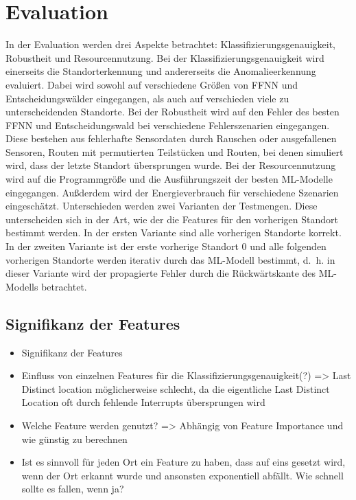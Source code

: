 \chapter{Evaluation}
In der Evaluation werden drei Aspekte betrachtet: Klassifizierungsgenauigkeit, Robustheit und Resourcennutzung.
Bei der Klassifizierungsgenauigkeit wird einerseits die Standorterkennung und andererseits die Anomalieerkennung evaluiert.
Dabei wird sowohl auf verschiedene Größen von FFNN und Entscheidungswälder eingegangen,
als auch auf verschieden viele zu unterscheidenden Standorte.
\newline
\newline
Bei der Robustheit wird auf den Fehler des besten FFNN und Entscheidungswald bei verschiedene Fehlerszenarien eingegangen.
Diese bestehen aus fehlerhafte Sensordaten durch Rauschen oder ausgefallenen Sensoren,
Routen mit permutierten Teilstücken und Routen, bei denen simuliert wird, dass der letzte Standort übersprungen wurde.
\newline
\newline
Bei der Resourcennutzung wird auf die Programmgröße und die Ausführungszeit der besten ML-Modelle eingegangen.
Außderdem wird der Energieverbrauch für verschiedene Szenarien eingeschätzt.
\newline
\newline
Unterschieden werden zwei Varianten der Testmengen.
Diese unterscheiden sich in der Art, wie der die Features für den vorherigen Standort bestimmt werden.
In der ersten Variante sind alle vorherigen Standorte korrekt.
In der zweiten Variante ist der erste vorherige Standort 0 und alle folgenden vorherigen Standorte werden iterativ durch das ML-Modell bestimmt,
d.~h. in dieser Variante wird der propagierte Fehler durch die Rückwärtskante des ML-Modells betrachtet.





\section{Signifikanz der Features}
\begin{itemize}
    \item Signifikanz der Features
    \item Einfluss von einzelnen Features für die Klassifizierungsgenauigkeit(?) => Last Distinct location möglicherweise schlecht, da die eigentliche Last Distinct Location oft durch fehlende Interrupts übersprungen wird
    \item Welche Feature werden genutzt? => Abhängig von Feature Importance und wie günstig zu berechnen
    \item Ist es sinnvoll für jeden Ort ein Feature zu haben, dass auf eins gesetzt wird, wenn der Ort erkannt wurde und ansonsten exponentiell abfällt. Wie schnell sollte es fallen, wenn ja?
\end{itemize}

